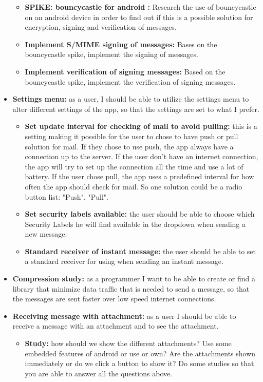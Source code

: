 \begin{itemize}
\begin{itemize}
\item{}\textbf{SPIKE: bouncycastle for android :} Research the use of bouncycastle on an android device in order to find out if this is a possible solution for encryption, signing and verification of messages.
\item{}\textbf{Implement S/MIME signing of messages:} Bases on the bouncycastle spike, implement the signing of messages. 
\item{}\textbf{Implement verification of signing messages:} Based on the bouncycastle spike, implement the verification of signing messages.
\end{itemize}
\item{}\textbf{Settings menu:} as a user, I should be able to utilize the settings menu to alter different settings of the app, so that the settings are set to what I prefer.
\begin{itemize}
\item{}\textbf{Set update interval for checking of mail to avoid pulling:} this is a setting making it possible for the user to chose to have push or pull solution for mail. If they chose to use push, the app always have a connection up to the server. If the user don’t have an internet connection, the app will try to set up the connection all the time and use a lot of battery. If the user chose pull, the app uses a predefined interval for how often the app should check for mail. So one solution could be a radio button list: "Push", "Pull".
\item{}\textbf{Set security labels available:} the user should be able to choose which Security Labels he will find available in the dropdown when sending a new message.
\item{}\textbf{Standard receiver of instant message:} the user should be able to set a standard receiver for using when sending an instant message.
\end{itemize}
\item{}\textbf{Compression study:} as a programmer I want to be able to create or find a library that minimize data traffic that is needed to send a message, so that the messages are sent faster over low speed internet connections.
\item{}\textbf{Receiving message with attachment:} as a user I should be able to receive a message with an attachment and to see the attachment.
\begin{itemize}
\item{}\textbf{Study:} how should we show the different attachments? Use some embedded features of android or use or own? Are the attachments shown immediately or do we click a button to show it? Do some studies so that you are able to answer all the questions above.

\end{itemize}
\end{itemize}

